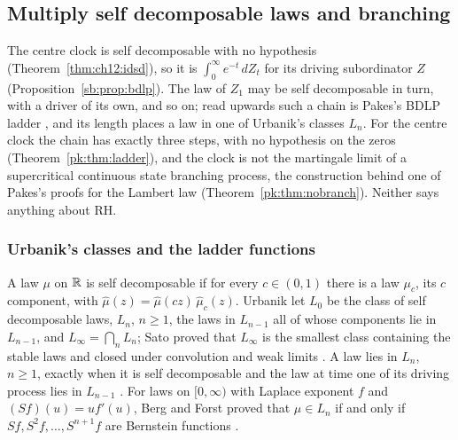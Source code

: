 \subsection{Multiply self decomposable laws and branching}\label{pk:sec:ladder}

The centre clock is self decomposable with no hypothesis (Theorem~\ref{thm:ch12:idsd}), so it is $\int_0^\infty e^{-t}\,dZ_t$ for its driving subordinator $Z$ (Proposition~\ref{sb:prop:bdlp}). The law of $Z_1$ may be self decomposable in turn, with a driver of its own, and so on; read upwards such a chain is Pakes's BDLP ladder \cite[Section 5]{Pakes26}, and its length places a law in one of Urbanik's classes $L_n$. For the centre clock the chain has exactly three steps, with no hypothesis on the zeros (Theorem~\ref{pk:thm:ladder}), and the clock is not the martingale limit of a supercritical continuous state branching process, the construction behind one of Pakes's proofs for the Lambert law (Theorem~\ref{pk:thm:nobranch}). Neither says anything about RH.

\subsubsection{Urbanik's classes and the ladder functions}\label{pk:sec:urbanik}

A law $\mu$ on $\mathbb{R}$ is self decomposable if for every $c\in(0,1)$ there is a law $\mu_c$, its $c$ component, with $\widehat\mu(z)=\widehat\mu(cz)\,\widehat\mu_c(z)$. Urbanik \cite{Urbanik73} let $L_0$ be the class of self decomposable laws, $L_n$, $n\ge1$, the laws in $L_{n-1}$ all of whose components lie in $L_{n-1}$, and $L_\infty=\bigcap_nL_n$; Sato proved that $L_\infty$ is the smallest class containing the stable laws and closed under convolution and weak limits \cite[Theorem 3.5]{Sato80}. A law lies in $L_n$, $n\ge1$, exactly when it is self decomposable and the law at time one of its driving process lies in $L_{n-1}$ \cite{IJS04}. For laws on $[0,\infty)$ with Laplace exponent $f$ and $(Sf)(u)=uf'(u)$, Berg and Forst proved that $\mu\in L_n$ if and only if $Sf,S^2f,\dots,S^{n+1}f$ are Bernstein functions \cite[Theorem 1.3]{BergForst83}.

